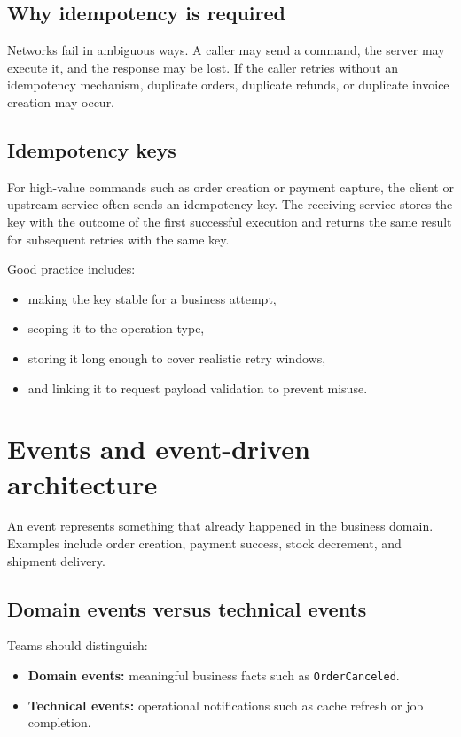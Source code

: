 \subsection{Why idempotency is required}
Networks fail in ambiguous ways.
A caller may send a command, the server may execute it, and the response may be lost.
If the caller retries without an idempotency mechanism, duplicate orders, duplicate refunds, or duplicate invoice creation may occur.

\subsection{Idempotency keys}
For high-value commands such as order creation or payment capture, the client or upstream service often sends an idempotency key.
The receiving service stores the key with the outcome of the first successful execution and returns the same result for subsequent retries with the same key.

Good practice includes:
\begin{itemize}
  \item making the key stable for a business attempt,
  \item scoping it to the operation type,
  \item storing it long enough to cover realistic retry windows,
  \item and linking it to request payload validation to prevent misuse.
\end{itemize}

\section{Events and event-driven architecture}
An event represents something that already happened in the business domain.
Examples include order creation, payment success, stock decrement, and shipment delivery.

\subsection{Domain events versus technical events}
Teams should distinguish:
\begin{itemize}
  \item \textbf{Domain events:} meaningful business facts such as \texttt{OrderCanceled}.
  \item \textbf{Technical events:} operational notifications such as cache refresh or job completion.
\end{itemize}


